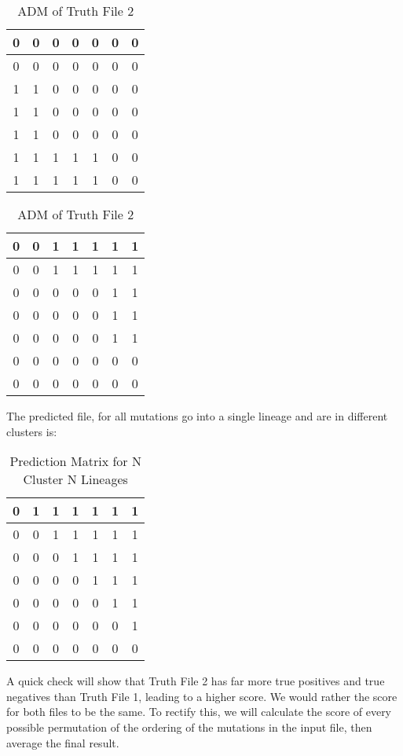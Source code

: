 \documentclass[a4paper, 11pt]{article}
\begin{document}
\begin{table}[H]
    \parbox{.45\linewidth}{
    \centering
    \begin{tabular}{||c c c c c c c||}
    \hline
    0 & 0 & 0 & 0 & 0 & 0 & 0\\
    \hline
    0 & 0 & 0 & 0 & 0 & 0 & 0\\
    \hline
    1 & 1 & 0 & 0 & 0 & 0 & 0\\
    \hline
    1 & 1 & 0 & 0 & 0 & 0 & 0\\
    \hline
    1 & 1 & 0 & 0 & 0 & 0 & 0\\
    \hline
    1 & 1 & 1 & 1 & 1 & 0 & 0\\
    \hline
    1 & 1 & 1 & 1 & 1 & 0 & 0\\
    \hline
    \end{tabular}
    \caption{ADM of Truth File 1}
    }
    \hfill
    \parbox{.45\linewidth}{
    \centering
    \begin{tabular}{||c c c c c c c||}
    \hline
    0 & 0 & 1 & 1 & 1 & 1 & 1\\
    \hline
    0 & 0 & 1 & 1 & 1 & 1 & 1\\
    \hline
    0 & 0 & 0 & 0 & 0 & 1 & 1\\
    \hline
    0 & 0 & 0 & 0 & 0 & 1 & 1\\
    \hline
    0 & 0 & 0 & 0 & 0 & 1 & 1\\
    \hline
    0 & 0 & 0 & 0 & 0 & 0 & 0\\
    \hline
    0 & 0 & 0 & 0 & 0 & 0 & 0\\
    \hline
    \end{tabular}
    \caption{ADM of Truth File 2}
    }
\end{table}

The predicted file, for all mutations go into a single lineage and are in different clusters is:

\begin{center}
    \begin{table}[H]
    \centering
    \begin{tabular}{||c c c c c c c||}
    \hline
    0 & 1 & 1 & 1 & 1 & 1 & 1\\
    \hline
    0 & 0 & 1 & 1 & 1 & 1 & 1\\
    \hline
    0 & 0 & 0 & 1 & 1 & 1 & 1\\
    \hline
    0 & 0 & 0 & 0 & 1 & 1 & 1\\
    \hline
    0 & 0 & 0 & 0 & 0 & 1 & 1\\
    \hline
    0 & 0 & 0 & 0 & 0 & 0 & 1\\
    \hline
    0 & 0 & 0 & 0 & 0 & 0 & 0\\
    \hline
    \end{tabular}
    \caption{Prediction Matrix for N Cluster N Lineages}
    \label{table:files}
    \end{table}
\end{center}

A quick check will show that Truth File 2 has far more true positives and true negatives than Truth File 1, leading to a higher score. We would rather the score for both files to be the same. To rectify this, we will calculate the score of every possible permutation of the ordering of the mutations in the input file, then average the final result.
\end{document}
